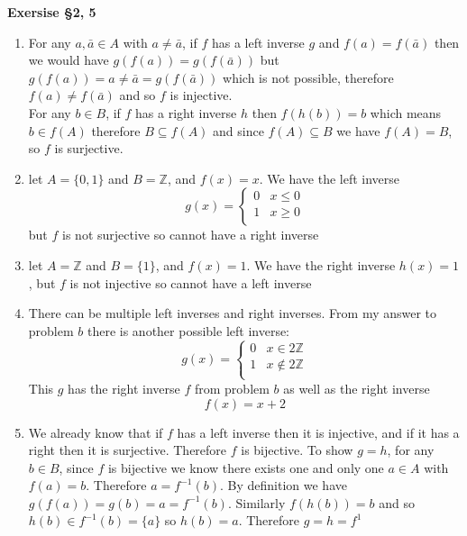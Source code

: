 \documentclass[12pt]{article}
\newenvironment{ques}[1]{\textbf{Exersise #1}\vspace{1 mm}\\ }{\bigskip}
\theoremstyle{definition}
\begin{document}
\begin{ques}{\S 2, 5}
	\begin{enumerate}
		\item
			For any $a, \bar a \in A$ with $a \neq \bar a$, if $f$
			has a left inverse $g$ and $f(a) = f(\bar a)$ then we
			would have $g(f(a)) = g(f(\bar a))$ but $g(f(a)) = a
			\neq \bar a = g(f(\bar a))$ which is not possible,
			therefore $f(a) \neq f(\bar a)$ and so $f$ is injective.\\
			For any $b \in B$, if $f$
			has a right inverse $h$ then $f(h(b)) = b$ which means
			$b \in f(A)$ therefore $B \subseteq f(A)$ and since
			$f(A) \subseteq B$ we have $f(A) = B$, so $f$ is surjective.

		\item
			let $A = \{0, 1\}$ and $B = \mathbb Z$, and $f(x) = x$. We
			have the left inverse
			$$g(x) = \begin{cases} 
				0 & x\leq 0 \\
				1 & x\geq0 \\
			\end{cases}$$
			but $f$ is not
			surjective so cannot have a right inverse

		\item
			let $A = \mathbb Z$ and $B = \{1\}$, and $f(x) = 1$. We
			have the right inverse $h(x) = 1$, but $f$ is not
			injective so cannot have a left inverse

		\item
			There can be multiple left inverses and right
			inverses. From my answer to problem $b$ there is another
			possible left inverse:
			$$g(x) = \begin{cases} 
				0 & x \in 2\mathbb Z \\
				1 & x\notin 2\mathbb Z \\
			\end{cases}$$
			This $g$ has the right inverse $f$ from problem $b$ as well as the right inverse
			$$f(x) = x + 2$$
			
		\item
			We already know that if $f$ has a left inverse then it
			is injective, and if it has a right then it is
			surjective. Therefore $f$ is bijective. To show $g =
			h$, for any $b \in B$, since $f$ is bijective we know
			there exists one and only one $a \in A$ with $f(a) =
			b$. Therefore $a = f^{-1}(b)$. By definition we have
			$g(f(a)) = g(b) = a = f^{-1}(b)$. Similarly $f(h(b)) =
			b$ and so $h(b) \in f^{-1}(b) = \{a\}$ so $h(b) = a$.
			Therefore $g = h= f^{1}$

	\end{enumerate}
\end{ques}
\end{document}
